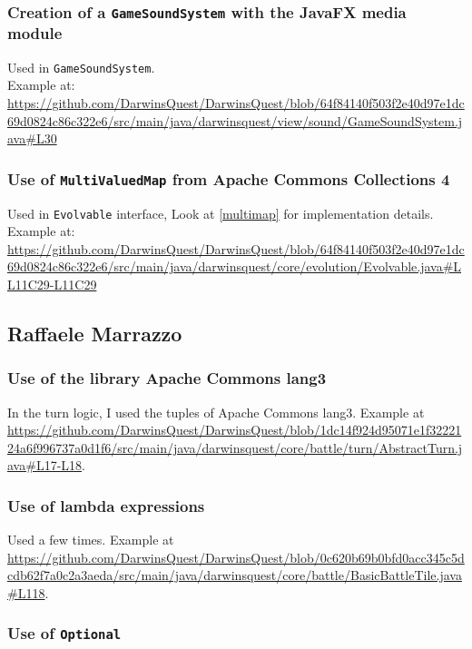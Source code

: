 \documentclass[12pt, a4paper]{report}
\theoremstyle{definition}
\begin{document}
    \subsubsection{Creation of a \texttt{GameSoundSystem} with the JavaFX media module}
    Used in \verb|GameSoundSystem|.\\
    Example at: \url{https://github.com/DarwinsQuest/DarwinsQuest/blob/64f84140f503f2e40d97e1dc69d0824c86c322e6/src/main/java/darwinsquest/view/sound/GameSoundSystem.java#L30}

    \subsubsection{Use of \texttt{MultiValuedMap} from Apache Commons Collections 4}
    Used in \verb|Evolvable| interface, Look at \ref{multimap} for implementation details.\\
    Example at: \url{https://github.com/DarwinsQuest/DarwinsQuest/blob/64f84140f503f2e40d97e1dc69d0824c86c322e6/src/main/java/darwinsquest/core/evolution/Evolvable.java#LL11C29-L11C29}

    \subsection*{Raffaele Marrazzo}

    \subsubsection{Use of the library Apache Commons lang3}
    
    In the turn logic, I used the tuples of Apache Commons lang3.
    Example at \url{https://github.com/DarwinsQuest/DarwinsQuest/blob/1dc14f924d95071e1f3222124a6f996737a0d1f6/src/main/java/darwinsquest/core/battle/turn/AbstractTurn.java#L17-L18}.

    \subsubsection{Use of lambda expressions}
    
    Used a few times.
    Example at \url{https://github.com/DarwinsQuest/DarwinsQuest/blob/0c620b69b0bfd0acc345c5dcdb62f7a0c2a3aeda/src/main/java/darwinsquest/core/battle/BasicBattleTile.java#L118}.

    \subsubsection{Use of \texttt{Optional}}
\end{document}
